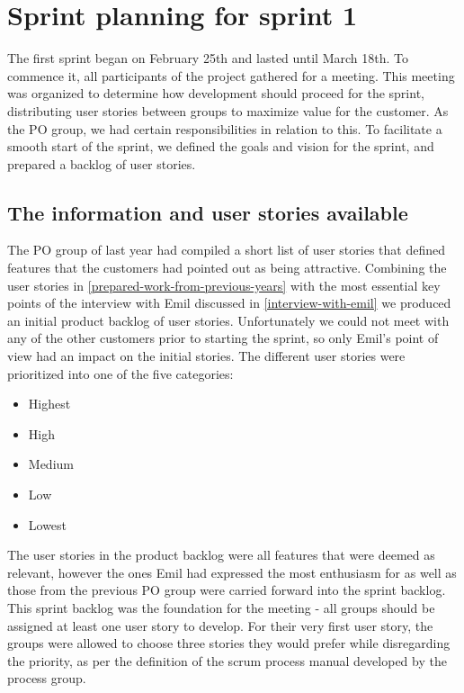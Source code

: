 \section{Sprint planning for sprint 1}\label{sprint-1-planning}
The first sprint began on February 25th and lasted until March 18th.
To commence it, all participants of the project gathered for a meeting.
This meeting was organized to determine how development should proceed for the sprint, distributing user stories between groups to maximize value for the customer.
As the PO group, we had certain responsibilities in relation to this.
To facilitate a smooth start of the sprint, we defined the goals and vision for the sprint, and prepared a backlog of user stories.

\subsection{The information and user stories available}
The PO group of last year had compiled a short list of user stories that defined features that the customers had pointed out as being attractive.
Combining the user stories in \autoref{prepared-work-from-previous-years} with the most essential key points of the interview with Emil discussed in \autoref{interview-with-emil} we produced an initial product backlog of user stories.
Unfortunately we could not meet with any of the other customers prior to starting the sprint, so only Emil's point of view had an impact on the initial stories.
The different user stories were prioritized into one of the five categories:
\begin{itemize}
    \item Highest
    \item High
    \item Medium
    \item Low
    \item Lowest
\end{itemize}
\noindent
The user stories in the product backlog were all features that were deemed as relevant, however the ones Emil had expressed the most enthusiasm for as well as those from the previous PO group were carried forward into the sprint backlog.
This sprint backlog was the foundation for the meeting - all groups should be assigned at least one user story to develop.
For their very first user story, the groups were allowed to choose three stories they would prefer while disregarding the priority, as per the definition of the scrum process manual developed by the process group.


